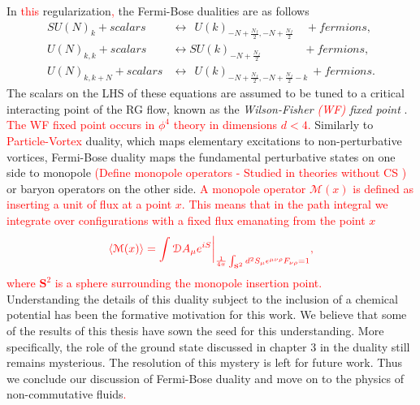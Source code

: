         \indent In \textcolor{red}{this} regularization\textcolor{red}{,} the Fermi-Bose dualities are as follows \cite{Aharony:2015mjs} 
            \begin{align}
                SU(N)_k + scalars &\longleftrightarrow \ \ U(k)_{-N +\frac{N_f}{2}, -N + \frac{N_f}{2}} \quad + fermions, \label{eq:Fermi-Bose_1} \\
                U(N)_{k,k} + scalars &\longleftrightarrow SU(k)_{-N +\frac{N_f}{2}}\qquad \ \ \ \quad+ fermions,  \label{eq:Fermi-Bose_2}\\
                U(N)_{k,k+N} + scalars &\longleftrightarrow \ \ U(k)_{-N +\frac{N_f}{2}, -N + \frac{N_f}{2}-k} \ + fermions.  \label{eq:Fermi-Bose_3}
            \end{align}
            The scalars on the LHS of these equations are assumed to be tuned to a critical interacting point of the RG flow, known as the \textit{Wilson-Fisher \textcolor{red}{(WF)} fixed point} \cite{Wilson:1971dc}. \textcolor{red}{The WF fixed point occurs in $\phi^4$ theory in dimensions $d<4$.} Similarly to \textcolor{red}{Particle-Vortex} duality, which maps elementary excitations to non-perturbative vortices, Fermi-Bose duality maps the fundamental perturbative states on one side to monopole \textcolor{red}{(Define monopole operators - Studied in theories without CS \cite{Borokhov:2002ib, Borokhov:2002cg, Pufu:2013eda, Pufu:2013vpa})}  or baryon operators on the other side. \textcolor{red}{A monopole operator $\mathcal{M}(x)$ is defined as inserting a unit of flux at a point $x$. This means that in the path integral we integrate over configurations with a fixed flux emanating from the point $x$} \\
\begin{align}
    \textcolor{red}{ \langle \mathcal{M}(x) \rangle = \int \mathcal{D}A_{\mu} e^{i S}\bigg |_{\frac{1}{4\pi} \int_{\textbf{S}^2} d^2S_{\mu} \epsilon^{\mu \nu \rho}F_{\nu \rho} =1}, }
\end{align}
    \textcolor{red}{where $\mathbf{S}^2$ is a sphere surrounding the monopole insertion point.} \\
            \indent Understanding the details of this duality subject to the inclusion of a chemical potential has been the formative motivation for this work. We believe that some of the results of this thesis have sown the seed for this understanding. More specifically, the role of the ground state discussed in chapter 3 in the duality still remains mysterious. The resolution of this mystery is left for future work. Thus we conclude our discussion of Fermi-Bose duality and move on to the physics of non-commutative fluids\textcolor{red}{.}
%
